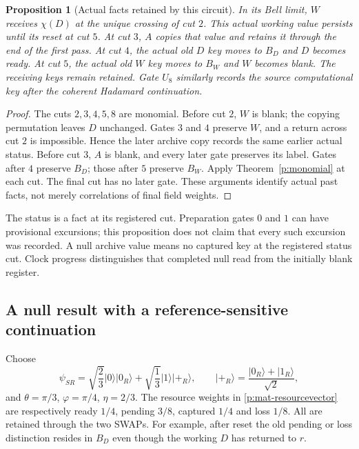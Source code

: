 \documentclass[11pt,oneside,openany]{book}
\newtheorem{proposition}[theorem]{Proposition}
\theoremstyle{definition}
\theoremstyle{remark}\newtheorem{remark}[theorem]{Remark}
\begin{document}
\begin{proposition}[Actual facts retained by this circuit]
\label{p:mat-resourcehistory}
In its Bell limit, $W$ receives $\chi(D)$ at the unique crossing of
cut $2$.  This actual working value persists until its reset at
cut $5$.  At cut $3$, $A$ copies that value and retains it through
the end of the first pass.  At cut $4$, the actual old $D$ key moves
to $B_D$ and $D$ becomes ready.  At cut $5$, the actual old $W$ key
moves to $B_W$ and $W$ becomes blank.  The receiving keys remain
retained.  Gate $U_8$ similarly records the source computational key
after the coherent Hadamard continuation.
\end{proposition}
\begin{proof}
The cuts $2,3,4,5,8$ are monomial.  Before cut $2$, $W$ is blank;
the copying permutation leaves $D$ unchanged.  Gates $3$ and $4$
preserve $W$, and a return across cut $2$ is impossible.  Hence the
later archive copy records the same earlier actual status.
Before cut $3$, $A$ is blank, and every later gate preserves its
label.  Gates after $4$ preserve $B_D$; those after $5$ preserve
$B_W$.  Apply Theorem~\ref{p:monomial} at each cut.  The final cut has
no later gate.  These arguments identify actual past facts, not
merely correlations of final field weights.
\end{proof}
The status is a fact at its registered cut.  Preparation gates $0$
and $1$ can have provisional excursions; this proposition does not
claim that every such excursion was recorded.  A null archive value
means no captured key at the registered status cut.  Clock progress
distinguishes that completed null read from the initially blank
register.

\subsection{A null result with a reference-sensitive continuation}

Choose
\begin{equation}\label{p:mat-input}
 \psi_{SR}=\sqrt{\frac23}|0\rangle|0_R\rangle+
           \sqrt{\frac13}|1\rangle|+_R\rangle,
 \qquad |+_R\rangle=\frac{|0_R\rangle+|1_R\rangle}{\sqrt2},
\end{equation}
and $\theta=\pi/3$, $\varphi=\pi/4$, $\eta=2/3$.
The resource weights in \eqref{p:mat-resourcevector} are respectively
ready $1/4$, pending $3/8$, captured $1/4$ and loss $1/8$.
All are retained through the two SWAPs.  For example, after reset
the old pending or loss distinction resides in $B_D$ even though
the working $D$ has returned to $r$.
\end{document}
